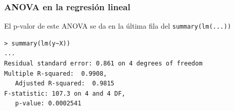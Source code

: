 \documentclass[12pt,t]{beamer}
\theoremstyle{plain}
\theoremstyle{definition}
\begin{document}
\begin{frame}[fragile]
\frametitle{ANOVA en la regresión lineal}
El p-valor de este ANOVA se da en la última fila del \texttt{summary(lm(...))}\medskip

\begin{lstlisting}
> summary(lm(y~X))
...
Residual standard error: 0.861 on 4 degrees of freedom
Multiple R-squared:  0.9908,	
   Adjusted R-squared:  0.9815 
F-statistic: 107.3 on 4 and 4 DF,  
   p-value: 0.0002541
\end{lstlisting}

\end{frame}
\end{document}
